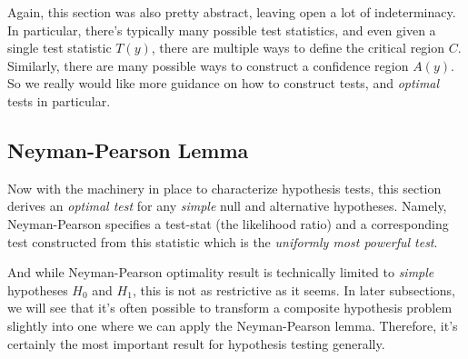 \documentclass[12pt]{article}
\theoremstyle{plain}
\theoremstyle{definition}
\theoremstyle{remark}
\begin{document}
Again, this section was also pretty abstract, leaving open a lot of
indeterminacy. In particular, there's typically many possible test
statistics, and even given a single test statistic $T(y)$, there are
multiple ways to define the critical region $C$.
Similarly, there are many possible ways to construct a confidence region
$A(y)$. So we really would like more guidance on how to construct tests,
and \emph{optimal} tests in particular.


\clearpage
\subsection{Neyman-Pearson Lemma}
\label{sec:neymanpearson}

Now with the machinery in place to characterize hypothesis tests, this
section derives an \emph{optimal test} for any \emph{simple} null and
alternative hypotheses.
Namely, Neyman-Pearson specifies a test-stat (the likelihood ratio) and
a corresponding test constructed from this statistic which is the
\emph{uniformly most powerful test}.

And while Neyman-Pearson optimality result is technically limited to
\emph{simple} hypotheses $H_0$ and $H_1$, this is not as restrictive as
it seems. In later subsections, we will see that it's often possible to
transform a composite hypothesis problem slightly into one where we can
apply the Neyman-Pearson lemma.
Therefore, it's certainly the most important result for hypothesis
testing generally.
\end{document}
